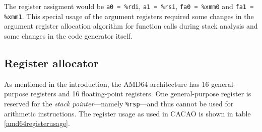 The register assigment would be \texttt{a0 = \%rdi}, \texttt{a1 =
\%rsi}, \texttt{fa0 = \%xmm0} and \texttt{fa1 = \%xmm1}. This special
usage of the argument registers required some changes in the argument
register allocation algorithm for function calls during stack
analysis and some changes in the code generator itself.


\subsection{Register allocator}

As mentioned in the introduction, the AMD64 architecture has 16
general-purpose registers and 16 floating-point registers. One
general-purpose register is reserved for the \textit{stack
pointer}---namely \texttt{\%rsp}---and thus cannot be used for
arithmetic instructions. The register usage as used in CACAO is shown
in table \ref{amd64registerusage}.


